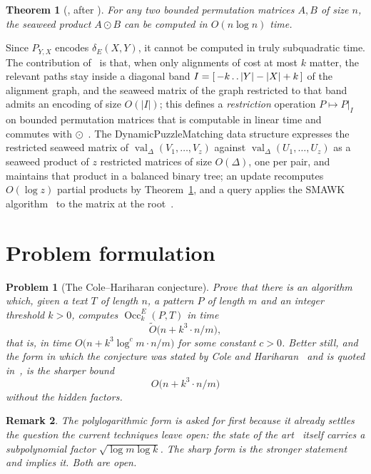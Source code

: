 \documentclass[10pt]{article}
\newtheorem{problem}{Problem}
\newtheorem{theorem}{Theorem}
\newtheorem{remark}[theorem]{Remark}
\newcommand{\dE}{\delta_E}
\newcommand{\Occ}{\operatorname{Occ}^E}
\newcommand{\DPM}{\textnormal{Dynamic\hspace{0pt}Puzzle\hspace{0pt}Matching}}
\newcommand{\val}{\operatorname{val}}
\newcommand{\Ot}{\widetilde{O}}
\begin{document}
\begin{theorem}[{\cite[Theorem 8.2]{CKW22}}, after {\cite{Tiskin15,TiskinArXiv}}]\label{thm:steadyant}
For any two bounded permutation matrices $A,B$ of size $n$, the seaweed product
$A\odot B$ can be computed in $O(n\log n)$ time.
\end{theorem}

Since $P_{Y,X}$ encodes $\dE(X,Y)$, it cannot be computed in truly subquadratic
time. The contribution of~\cite[Section 8]{CKW22} is that, when only alignments
of cost at most $k$ matter, the relevant paths stay inside a diagonal band
$I=[\,-k\mathinner{.\,.}|Y|-|X|+k\,]$ of the alignment graph, and the seaweed matrix of the
graph restricted to that band admits an encoding of size $O(|I|)$; this defines
a \emph{restriction} operation $P\mapsto P|_I$ on bounded permutation matrices
that is computable in linear time and commutes with $\odot$~\cite[Lemmas 8.16,
8.20, 8.21]{CKW22}. The \DPM{} data structure expresses the restricted seaweed
matrix of $\val_\Delta(V_1,\ldots,V_z)$ against $\val_\Delta(U_1,\ldots,U_z)$
as a seaweed product of $z$ restricted matrices of size $O(\Delta)$, one per
pair, and maintains that product in a balanced binary tree; an update
recomputes $O(\log z)$ partial products by Theorem~\ref{thm:steadyant}, and a
query applies the SMAWK algorithm~\cite{AKMSW87} to the matrix at the
root~\cite[Lemma 9.5, Section 9]{CKW22}.

\section{Problem formulation}

\begin{problem}[The Cole--Hariharan conjecture]\label{prob:CH}
Prove that there is an algorithm which, given a text $T$ of length $n$, a
pattern $P$ of length $m$ and an integer threshold $k>0$, computes
$\Occ_k(P,T)$ in time
\[
\Ot\bigl(n+k^3\cdot n/m\bigr),
\]
that is, in time $O\bigl(n+k^3\log^{c}m\cdot n/m\bigr)$ for some constant
$c>0$. Better still, and the form in which the conjecture was stated by Cole
and Hariharan~\cite{CH02} and is quoted in~\cite[Section 1]{CKW22}, is the
sharper bound
\[
O\bigl(n+k^3\cdot n/m\bigr)
\]
without the hidden factors.
\end{problem}

\begin{remark}\label{rem:CHsoft}
The polylogarithmic form is asked for first because it already settles the
question the current techniques leave open: the state of the
art~\cite[Main Theorems 1 and 2]{CKW22} itself carries a subpolynomial factor
$\sqrt{\log m\log k}$. The sharp form is the stronger statement and implies it.
Both are open.
\end{remark}
\end{document}
